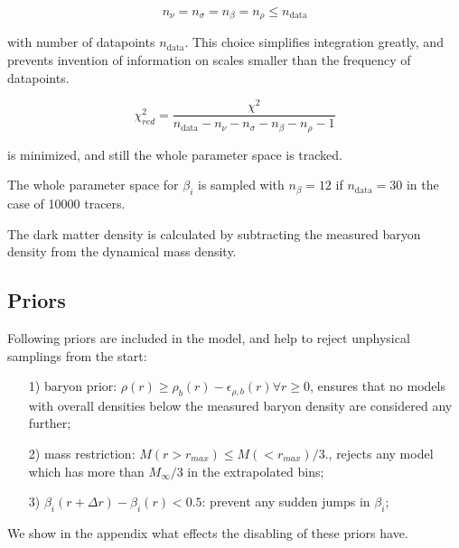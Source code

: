 \begin{equation}
n_\nu = n_\sigma = n_\beta = n_\rho \leq n_{\text{data}}
\end{equation}

with number of datapoints $n_{\text{data}}$. This choice simplifies
integration greatly, and prevents invention of information on scales
smaller than the frequency of datapoints.


\begin{equation}
\chi^2_{red} = \frac{\chi^2}{n_{\text{data}} - n_\nu - n_\sigma - n_\beta - n_\rho -1}
\end{equation}

is minimized, and still the whole parameter space is tracked.

The whole parameter space for $\beta_i$ is sampled with $n_\beta=12$
if $n_{\text{data}}=30$ in the case of 10000 tracers.

The dark matter density is calculated by subtracting the measured
baryon density from the dynamical mass density.

\subsection{Priors}
Following priors are included in the model, and help to reject
unphysical samplings from the start:

\begin{enumerate}
    \item[1)] baryon prior: $\rho(r) \geq
    \rho_b(r)-\epsilon_{\rho,b}(r) \forall r\geq0$, ensures that no
    models with overall densities below the measured baryon density
    are considered any further;

\item[2)] mass restriction: $M(r>r_{max}) \leq M(<r_{max})/3.$, rejects any
  model which has more than $M_\infty/3$ in the extrapolated bins;

\item[3)] $\beta_i(r+\Delta r)-\beta_i(r) < 0.5$: prevent any sudden
  jumps in $\beta_i$;
\end{enumerate}

We show in the appendix what effects the disabling of these priors
have.
